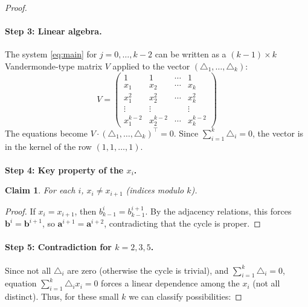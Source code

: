 \documentclass[a4paper]{article}
\newtheorem{claim}[thm]{Claim}
\begin{document}
\begin{proof}
        \paragraph{Step 3: Linear algebra.}
        The system \eqref{eq:main} for $j=0,\ldots,k-2$ can be written as a $(k-1) \times k$ Vandermonde-type matrix $V$ applied to the vector $(\triangle_1,\ldots,\triangle_k)$:
        \[
            V = \begin{pmatrix}
                1 & 1 & \cdots & 1 \\
                x_1 & x_2 & \cdots & x_k \\
                x_1^2 & x_2^2 & \cdots & x_k^2 \\
                \vdots & \vdots & & \vdots \\
                x_1^{k-2} & x_2^{k-2} & \cdots & x_k^{k-2}
            \end{pmatrix}
        \]
        The equations become $V \cdot (\triangle_1,\ldots,\triangle_k)^\top = 0$.
        Since $\sum_{i=1}^k \triangle_i = 0$, the vector is in the kernel of the row $(1,1,\ldots,1)$.\\\\
        \textbf{Step 4: Key property of the $x_i$.}
        \begin{claim}
            For each $i$, $x_i \neq x_{i+1}$ (indices modulo $k$).
        \end{claim}
        \begin{proof}
            If $x_i = x_{i+1}$, then $b_{k-1}^i = b_{k-1}^{i+1}$. By the adjacency relations, this forces $\mathbf{b}^i = \mathbf{b}^{i+1}$, so $\mathbf{a}^{i+1} = \mathbf{a}^{i+2}$, contradicting that the cycle is proper.
        \end{proof}

        \paragraph{Step 5: Contradiction for $k=2,3,5$.}
        Since not all $\triangle_i$ are zero (otherwise the cycle is trivial), and $\sum_{i=1}^k \triangle_i = 0$, equation $\sum_{i=1}^k \triangle_i x_i = 0$ forces a linear dependence among the $x_i$ (not all distinct). Thus, for these small $k$ we can classify possibilities:


\end{proof}
\end{document}
